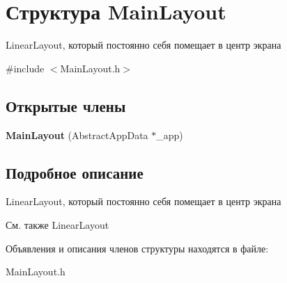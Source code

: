 \hypertarget{struct_main_layout}{
\section{Структура MainLayout}
\label{struct_main_layout}
}


LinearLayout, который постоянно себя помещает в центр экрана  




{\ttfamily \#include $<$MainLayout.h$>$}

\subsection*{Открытые члены}
\begin{DoxyCompactItemize}
\item 
\hypertarget{struct_main_layout_a149898e888a7519a9c040654a7e3621e}{
{\bfseries MainLayout} (AbstractAppData $\ast$\_\-app)}
\label{struct_main_layout_a149898e888a7519a9c040654a7e3621e}

\end{DoxyCompactItemize}


\subsection{Подробное описание}
LinearLayout, который постоянно себя помещает в центр экрана \begin{DoxySeeAlso}{См. также}
LinearLayout  
\end{DoxySeeAlso}


Объявления и описания членов структуры находятся в файле:\begin{DoxyCompactItemize}
\item 
MainLayout.h\end{DoxyCompactItemize}
